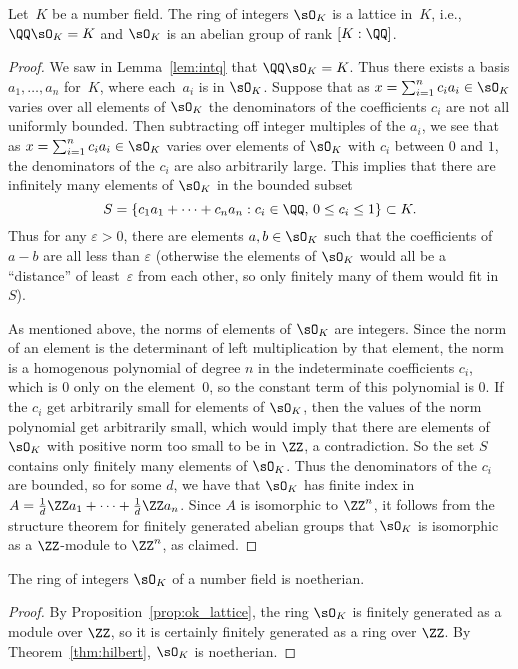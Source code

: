 \begin{proposition}\label{prop:ok_lattice}
  Let~$K$ be a number field.  The ring of integers $\sO_K$ is a
  lattice in~$K$, i.e., $\QQ\sO_K=K$ and $\sO_K$ is an abelian group
  of rank $[K:\QQ]$.
\end{proposition}
\begin{proof}
  We saw in Lemma~\ref{lem:intq} that $\QQ\sO_K=K$.  Thus there exists a
  basis $a_1,\dots, a_n$ for~$K$, where each~$a_i$ is in $\sO_K$.
  Suppose that as $x=\sum_{i=1}^n c_i a_i\in \sO_K$ varies over all
  elements of $\sO_K$ the denominators of the coefficients $c_i$ are not
  all uniformly bounded.  Then subtracting off integer multiples of the
  $a_i$, we see that as $x=\sum_{i=1}^n c_i a_i\in \sO_K$ varies over
  elements of $\sO_K$ with $c_i$ between $0$ and $1$, the denominators of
  the $c_i$ are also arbitrarily large.  This implies that there are
  infinitely many elements of $\sO_K$ in the bounded subset
  \[
    S = \left\{
      c_1 a_1 +\cdots + c_n a_n : c_i \in \QQ,\, 0\leq c_i \leq 1
    \right\} \subset K.
  \]
  Thus for any $\varepsilon>0$, there are elements $a,b\in \sO_K$ such that the
  coefficients of $a-b$ are all less than $\varepsilon$ (otherwise the elements
  of $\sO_K$ would all be a ``distance''
  of least~$\varepsilon$ from each other, so only finitely
  many of them would fit in~$S$).

  As mentioned above, the norms of elements of $\sO_K$ are integers.
  Since the norm of an element is the determinant of left multiplication
  by that element, the norm is a homogenous polynomial of degree $n$ in
  the indeterminate coefficients $c_i$, which is $0$ only on the
  element~$0$, so the constant term of this polynomial is $0$.
  If the $c_i$ get arbitrarily small for elements of
  $\sO_K$, then the values of the norm polynomial get arbitrarily small,
  which would imply that there are elements of $\sO_K$ with positive norm
  too small to be in $\ZZ$, a contradiction.  So the set $S$ contains
  only finitely many elements of $\sO_K$.  Thus the denominators of the
  $c_i$ are bounded, so for some $d$, we have that $\sO_K$ has finite
  index in $A=\frac{1}{d}\ZZ a_1 + \cdots + \frac{1}{d}\ZZ a_n$.  Since
  $A$ is isomorphic to $\ZZ^n$, it follows from the structure theorem for
  finitely generated abelian groups that $\sO_K$ is isomorphic as a
  $\ZZ$-module to $\ZZ^n$, as claimed.
\end{proof}

\begin{corollary}\label{prop:intnoetherian}
  The ring of integers $\sO_K$ of a number field is noetherian.
\end{corollary}
\begin{proof}
  By Proposition~\ref{prop:ok_lattice}, the ring $\sO_K$ is
  finitely generated as a module over $\ZZ$, so it is certainly
  finitely generated as a ring over $\ZZ$.
  By Theorem~\ref{thm:hilbert}, $\sO_K$ is noetherian.
\end{proof}



